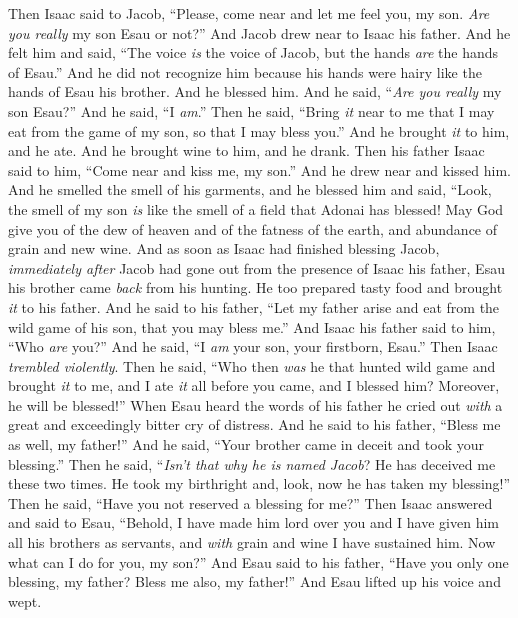 \begin{biblechapter}
\verse Then Isaac said to Jacob, “Please, come near and let me feel you, my son. \textit{Are you really} my son Esau or not?”
\verse And Jacob drew near to Isaac his father. And he felt him and said, “The voice \textit{is} the voice of Jacob, but the hands \textit{are} the hands of Esau.”
\verse And he did not recognize him because his hands were hairy like the hands of Esau his brother. And he blessed him.
\verse And he said, “\textit{Are you really} my son Esau?” And he said, “I \textit{am}.”
\verse Then he said, “Bring \textit{it} near to me that I may eat from the game of my son, so that I may bless you.” And he brought \textit{it} to him, and he ate. And he brought wine to him, and he drank.
\verse Then his father Isaac said to him, “Come near and kiss me, my son.”
\verse And he drew near and kissed him. And he smelled the smell of his garments, and he blessed him and said,
\verse “Look, the smell of my son \textit{is} like the smell of a field that Adonai has blessed!
\verse May God give you of the dew of heaven 
and of the fatness of the earth, 
and abundance of grain and new wine.
\verse And as soon as Isaac had finished blessing Jacob, \textit{immediately after} Jacob had gone out from the presence of Isaac his father, Esau his brother came \textit{back} from his hunting.
\verse He too prepared tasty food and brought \textit{it} to his father. And he said to his father, “Let my father arise and eat from the wild game of his son, that you may bless me.”
\verse And Isaac his father said to him, “Who \textit{are} you?” And he said, “I \textit{am} your son, your firstborn, Esau.”
\verse Then Isaac \textit{trembled violently}. Then he said, “Who then \textit{was} he that hunted wild game and brought \textit{it} to me, and I ate \textit{it} all before you came, and I blessed him? Moreover, he will be blessed!”
\verse When Esau heard the words of his father he cried out \textit{with} a great and exceedingly bitter cry of distress. And he said to his father, “Bless me as well, my father!”
\verse And he said, “Your brother came in deceit and took your blessing.”
\verse Then he said, “\textit{Isn’t that why he is named Jacob}? He has deceived me these two times. He took my birthright and, look, now he has taken my blessing!” Then he said, “Have you not reserved a blessing for me?”
\verse Then Isaac answered and said to Esau, “Behold, I have made him lord over you and I have given him all his brothers as servants, and \textit{with} grain and wine I have sustained him. Now what can I do for you, my son?”
\verse And Esau said to his father, “Have you only one blessing, my father? Bless me also, my father!” And Esau lifted up his voice and wept.

\end{biblechapter}

